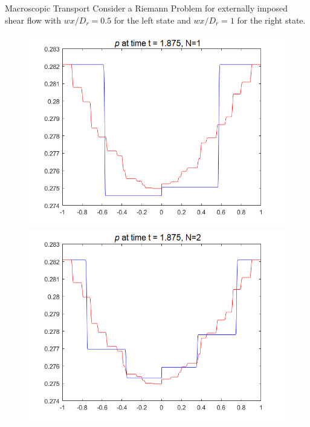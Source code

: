 \begin{frame}{Macroscopic Transport}
	\scriptsize
	Consider a Riemann Problem for externally imposed shear flow with $wx/D_r = 0.5$ for the left state and $wx/D_r = 1$ for the right state.
	\begin{figure}[H]
		\centering
		\begin{minipage}{0.32\textwidth}
			\includegraphics[width=\textwidth]{Bilder_wx/Wavepropa/red=12th_blue=2nd_wx=1_leftDr1_rightDr2_Awp12th}
		\end{minipage}
		\hfill
		\begin{minipage}{0.32\textwidth}
			\includegraphics[width=\textwidth]{Bilder_wx/Wavepropa/red=12th_blue=4th_wx=1_leftDr1_rightDr2_Awp12th}
		\end{minipage}

\end{figure}
\end{frame}
